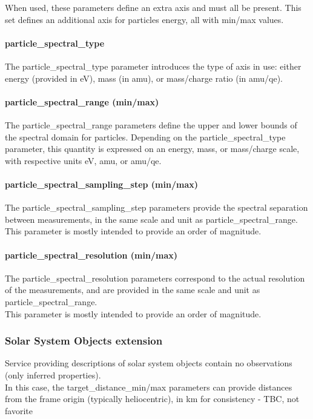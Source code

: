 \documentclass[11pt,a4paper]{ivoa}
\begin{document}
When used, these parameters define an extra axis and must all be present. This set defines an additional axis for particles energy, all with min/max values.

\paragraph{particle\_spectral\_type}

The particle\_spectral\_type parameter introduces the type of axis in use: either energy (provided in eV), mass (in amu), or mass/charge ratio (in amu/qe).

\paragraph{particle\_spectral\_range (min/max)}

The particle\_spectral\_range parameters define the upper and lower bounds of the spectral domain for particles. Depending on the particle\_spectral\_type parameter, this quantity is expressed on an energy, mass, or mass/charge scale, with respective units eV, amu, or amu/qe.

\paragraph{particle\_spectral\_sampling\_step (min/max)}

The particle\_spectral\_sampling\_step parameters provide the spectral separation between measurements, in the same scale and unit as particle\_spectral\_range.\\This parameter is mostly intended to provide an order of magnitude.

\paragraph{particle\_spectral\_resolution (min/max)}

The particle\_spectral\_resolution parameters correspond to the actual resolution of the measurements, and are provided in the same scale and unit as particle\_spectral\_range. \\This parameter is mostly intended to provide an order of magnitude.

\subsubsection{Solar System Objects extension}

Service providing descriptions of solar system objects contain no observations (only inferred properties).\\In this case, the target\_distance\_min/max parameters can provide distances from the frame origin (typically heliocentric), in km for consistency - TBC, not favorite
\end{document}
